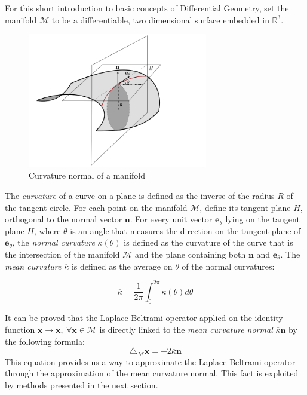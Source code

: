  For this short introduction to basic concepts of Differential Geometry, set the manifold $\mathcal M$ to be a differentiable, two dimensional surface embedded in $\mathbb R^3$. 
 \begin{figure}[h]
 	\centering
 	\includegraphics[width=0.7\textwidth]{figs/Chapter3/curvature.png}
 	\caption{\label{fig:curvature}Curvature normal of a manifold}
 \end{figure} 
The \textit{curvature} of a curve on a plane is defined as the inverse of the radius $R$ of the tangent circle. For each point on the manifold $\mathcal M$, define its tangent plane $H$, orthogonal to the normal vector $\mathbf n$. For every unit vector $\mathbf e_\theta$ lying on the tangent plane $H$, where $\theta$ is an angle that measures the direction on the tangent plane of $\mathbf e_\theta$, the \textit{normal curvature} $\kappa(\theta)$ is defined as the curvature of the curve that is the intersection of the manifold $\mathcal M$ and the plane containing both $\mathbf n$ and $\mathbf e_\theta$. The \textit{mean curvature} $\overline \kappa $ is defined as the average on $\theta$ of the normal curvatures:
 
 \begin{equation}\label{eq:mean curvature}
 	\overline \kappa=\frac{1}{2 \pi} \int_{0}^{2 \pi} \kappa(\theta) d \theta
 \end{equation}

It can be proved that the Laplace-Beltrami operator applied on the identity function $\mathbf x \rightarrow \mathbf x, \ \forall \mathbf x\in \mathcal M$ is directly linked to the \textit{mean curvature normal} $\overline{\kappa}\mathbf n$ by the following formula:
\begin{equation}\label{eq:laplacian and curvature}
	\triangle_\mathcal M \mathbf x  = -2\overline{\kappa}\mathbf n
\end{equation}
This equation provides us a way to approximate the Laplace-Beltrami operator through the approximation of the mean curvature normal. This fact is exploited by methods presented in the next section.

